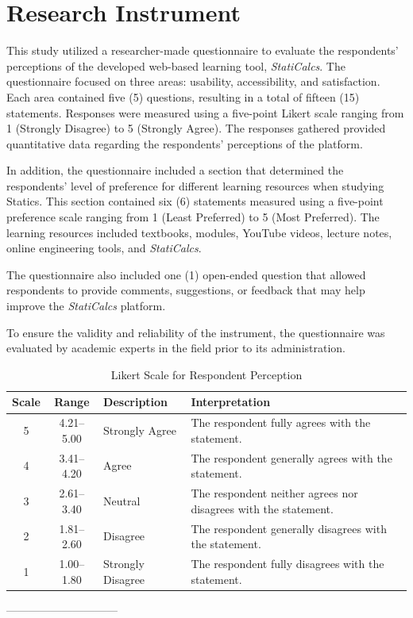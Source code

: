
\section{Research Instrument}\label{sec:3-stat}

This study utilized a researcher-made questionnaire to evaluate the respondents' perceptions of the developed web-based learning tool, \textit{StatiCalcs}. The questionnaire focused on three areas: usability, accessibility, and satisfaction. Each area contained five (5) questions, resulting in a total of fifteen (15) statements. Responses were measured using a five-point Likert scale ranging from 1 (Strongly Disagree) to 5 (Strongly Agree). The responses gathered provided quantitative data regarding the respondents’ perceptions of the platform.  

In addition, the questionnaire included a section that determined the respondents’ level of preference for different learning resources when studying Statics. This section contained six (6) statements measured using a five-point preference scale ranging from 1 (Least Preferred) to 5 (Most Preferred). The learning resources included textbooks, modules, YouTube videos, lecture notes, online engineering tools, and \textit{StatiCalcs}.  

The questionnaire also included one (1) open-ended question that allowed respondents to provide comments, suggestions, or feedback that may help improve the \textit{StatiCalcs} platform.  

To ensure the validity and reliability of the instrument, the questionnaire was evaluated by academic experts in the field prior to its administration.


\begin{table}[H]
\centering
\caption{Likert Scale for Respondent Perception}
\small
\renewcommand{\arraystretch}{1.3}

\begin{tabular}{ccp{3cm}p{7cm}}
\hline
\textbf{Scale} & \textbf{Range} & \textbf{Description} & \textbf{Interpretation}\\
\hline
5 & 4.21--5.00 & Strongly Agree & The respondent fully agrees with the statement.\\
4 & 3.41--4.20 & Agree & The respondent generally agrees with the statement.\\
3 & 2.61--3.40 & Neutral & The respondent neither agrees nor disagrees with the statement.\\
2 & 1.81--2.60 & Disagree & The respondent generally disagrees with the statement.\\
1 & 1.00--1.80 & Strongly Disagree & The respondent fully disagrees with the statement.\\
\hline
\end{tabular}
\end{table}------------------------------

